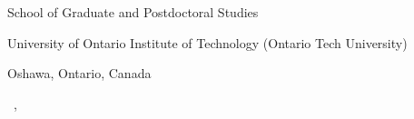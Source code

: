 \begin{titlepage}
\begin{center}
School of Graduate and Postdoctoral Studies 

\medskip

University of Ontario Institute of Technology (Ontario Tech University)

\medskip

Oshawa, Ontario, Canada

\medskip
\degreemonth{} \degreeyear

\vfill


\bigskip
\textcopyright{} \makeatletter \@firstname\ {\@lastname}\makeatother, \degreeyear



\vspace*{2\bigskipamount}

\end{center}

\end{titlepage}
